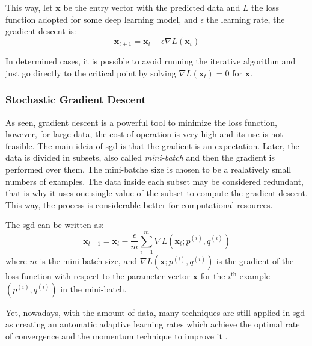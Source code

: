 This way, let \(\symbf{x}\) be the entry vector with the predicted data and \(L\) the loss function adopted for some deep learning model, and \(\epsilon\) the learning rate, the gradient descent is:
%
\begin{equation}
    \symbf{x}_{t+1} = \symbf{x}_t - \epsilon \nabla L(\symbf{x}_t)
\end{equation}

In determined cases, it is possible to avoid running the iterative algorithm and just go directly to the critical point by solving \(\nabla L(\symbf{x}_t) = 0\) for \(\symbf{x}\).

\subsubsection*{Stochastic Gradient Descent}

As seen, gradient descent is a powerful tool to minimize the loss function, however, for large data, the cost of operation is very high and its use is not feasible. 
The main ideia of \gls*{sgd} is that the gradient is an expectation.
Later, the data is divided in subsets, also called \emph{mini-batch} and then the gradient is performed over them.
The mini-batche size is chosen to be a realatively small numbers of examples.
The data inside each subset may be considered redundant, that is why it uses one single value of the subset to compute the gradient descent.
This way, the process is considerable better for computational resources.

The \gls*{sgd} can be written as:
%
\begin{equation}
    \symbf{x}_{t+1} = \symbf{x}_t - \frac{\epsilon}{m} \sum_{i=1}^m \nabla L(\symbf{x}_t; p^{(i)},q^{(i)})
\end{equation}
%
where \(m\) is the mini-batch size, and \(\nabla L(\symbf{x}; p^{(i)}, q^{(i)})\) is the gradient of the loss function with respect to the parameter vector \(\symbf{x}\) for the \(i^{\text{th}}\) example \((p^{(i)}, q^{(i)})\) in the mini-batch.

Yet, nowadays, with the amount of data, many techniques are still applied in \gls*{sgd} as creating an automatic adaptive learning rates which achieve the optimal rate of convergence \citep{darken1991} and the momentum technique to improve it \citep{sutskever2013}.
